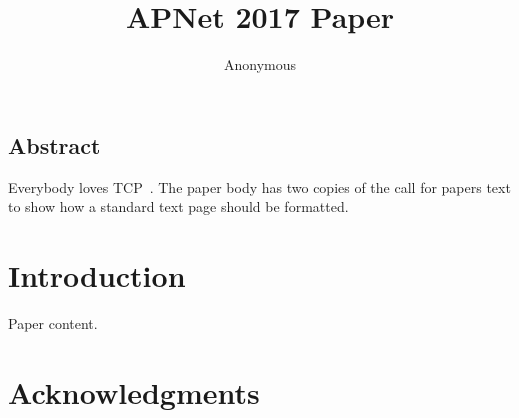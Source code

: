 \documentclass{apnet17}
\begin{document}
 {}
\date{}


\title{APNet 2017 Paper}

\author{Anonymous}

\maketitle


\subsection*{Abstract}

Everybody loves TCP~\cite{vanjacobson,fan2015grep}. The paper body has two copies
of the call for papers text to show how a standard text page should be
formatted.

\section{Introduction}

Paper content.

\section*{Acknowledgments}


\begin{small}

\end{small}
\label{last-page}
\end{document}
